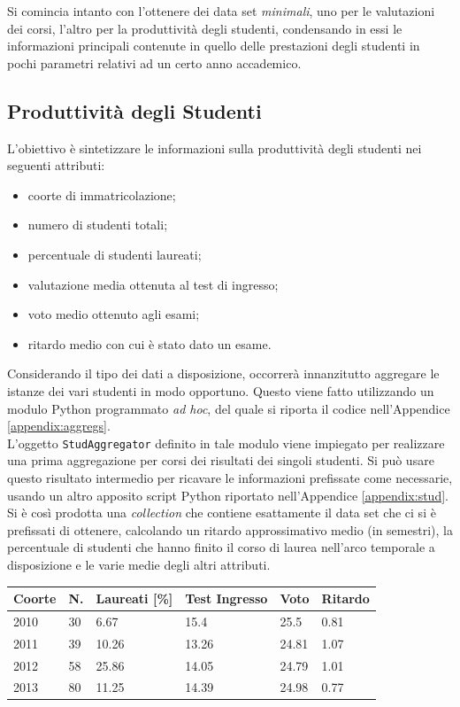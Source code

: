	Si comincia intanto con l'ottenere dei data set \textit{minimali}, uno per le valutazioni dei corsi, l'altro per la produttività degli studenti, condensando in essi le informazioni principali contenute in quello delle prestazioni degli studenti in pochi parametri relativi ad un certo anno accademico. \\

	\subsection{Produttività degli Studenti}
	\label{prepr:stud_min}

		L'obiettivo è sintetizzare le informazioni sulla produttività degli studenti nei seguenti attributi:

		\begin{itemize}
			\item coorte di immatricolazione;
			\item numero di studenti totali;
			\item percentuale di studenti laureati;
			\item valutazione media ottenuta al test di ingresso;
			\item voto medio ottenuto agli esami;
			\item ritardo medio con cui è stato dato un esame.
		\end{itemize}

		Considerando il tipo dei dati a disposizione, occorrerà innanzitutto aggregare le istanze dei vari studenti in modo opportuno. Questo viene fatto utilizzando un modulo Python programmato \textit{ad hoc}, del quale si riporta il codice nell'Appendice \ref{appendix:aggregs}. \\
		
		L'oggetto \texttt{StudAggregator} definito in tale modulo viene impiegato per realizzare una prima aggregazione per corsi dei risultati dei singoli studenti. Si può usare questo risultato intermedio per ricavare le informazioni prefissate come necessarie, usando un altro apposito script Python riportato nell'Appendice \ref{appendix:stud}. Si è così prodotta una \textit{collection} che contiene esattamente il data set che ci si è prefissati di ottenere, calcolando un ritardo approssimativo medio (in semestri), la percentuale di studenti che hanno finito il corso di laurea nell'arco temporale a disposizione e le varie medie degli altri attributi.\\

		\begin{tabular}{llllll}
		\hline
		Coorte & N. & Laureati {[}\%{]} & Test Ingresso & Voto & Ritardo \\ \hline
		2010 & 30 & 6.67 & 15.4 & 25.5 & 0.81 \\
		2011 & 39 & 10.26 & 13.26 & 24.81 & 1.07 \\
		2012 & 58 & 25.86 & 14.05 & 24.79 & 1.01 \\
		2013 & 80 & 11.25 & 14.39 & 24.98 & 0.77 \\ \hline
		\end{tabular}

